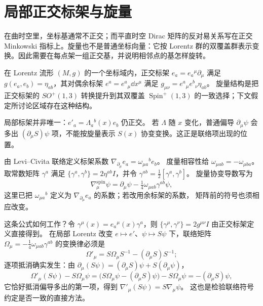 \section{局部正交标架与旋量}

在曲时空里，坐标基通常不正交；而平直时空 Dirac 矩阵的反对易关系写在正交 Minkowski 指标上。旋量也不是普通坐标向量：它按 Lorentz 群的双覆盖群表示变换。因此需要在每点架一组正交基，并说明相邻点的基怎样旋转。

\begin{definition}[正交标架与旋量结构]
在 Lorentz 流形 \((M,g)\) 的一个坐标域内，正交标架 \(e_a=e_a{}^\mu\partial_\mu\) 满足
\(g(e_a,e_b)=\eta_{ab}\)，其对偶余标架 \(e^a=e^a{}_\mu \dd x^\mu\) 满足
\(g_{\mu\nu}=e^a{}_\mu e^b{}_\nu\eta_{ab}\)。
旋量结构是把正交标架的 \(SO^+(1,3)\) 转换提升到其双覆盖
\(\operatorname{Spin}^+(1,3)\) 的一致选择；下文假定所讨论区域存在这种结构。
\end{definition}

局部标架并非唯一：\(e'_a=\Lambda_a{}^b(x)e_b\) 仍正交。
若 \(\Lambda\) 随 \(x\) 变化，普通偏导 \(\partial_\mu\psi\) 会多出
\((\partial_\mu S)\psi\) 项，不能按旋量表示 \(S(x)\) 协变变换。这正是联络项出现的位置。

\begin{definition}[自旋联络]
由 Levi--Civita 联络定义标架系数
\(\nabla_{\partial_\mu}e_a=\omega_{\mu a}{}^b e_b\)。
度量相容性给 \(\omega_{\mu ab}=-\omega_{\mu ba}\)。
取常数矩阵 \(\gamma^a\) 满足
\(\{\gamma^a,\gamma^b\}=2\eta^{ab}I\)，并令
\(\gamma^{ab}=\tfrac12[\gamma^a,\gamma^b]\)。
旋量协变导数写为
\[
\nabla_\mu^{\mathrm{spin}}\psi
=\partial_\mu\psi-\tfrac14\omega_{\mu ab}\gamma^{ab}\psi,
\]
这里已把 \(\omega_{\mu a}{}^b\) 定义为
\(\nabla_{\partial_\mu}e_a\) 的系数；若改用余标架的系数，
矩阵前的符号也须相应改变。
\end{definition}

这条公式如何工作？令
\(\gamma^\mu(x)=e_a{}^\mu(x)\gamma^a\)，则
\(\{\gamma^\mu,\gamma^\nu\}=2g^{\mu\nu}I\) 由正交标架定义直接得到。
在局部 Lorentz 改变 \(e\mapsto e'\)、\(\psi\mapsto S\psi\) 下，联络矩阵
\(\Omega_\mu=-\tfrac14\omega_{\mu ab}\gamma^{ab}\) 的变换律必须是
\[
\Omega'_\mu=S\Omega_\mu S^{-1}-(\partial_\mu S)S^{-1};
\]
逐项抵消确实发生：由
\(\partial_\mu(S\psi)=(\partial_\mu S)\psi+S(\partial_\mu\psi)\)，
\[
\Omega'_\mu(S\psi)-S\Omega_\mu\psi
=\bigl(S\Omega_\mu\psi-(\partial_\mu S)\psi\bigr)-S\Omega_\mu\psi
=-(\partial_\mu S)\psi,
\]
它恰好抵消偏导多出的第一项，得到
\(\nabla'_\mu(S\psi)=S\nabla_\mu\psi\)。
这也是检验联络符号约定是否一致的直接方法。

